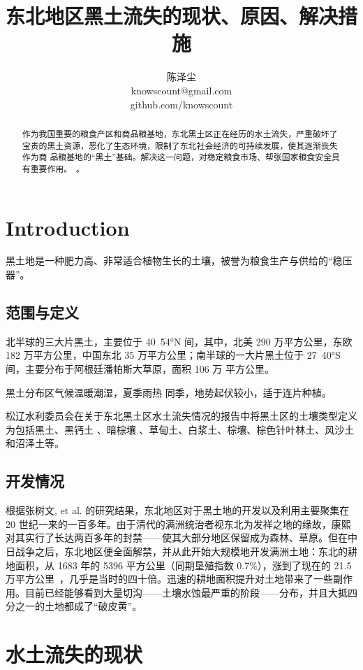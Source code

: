 \documentclass{nle}
\title[东北地区黑土流失的现状、原因、解决措施]
      {东北地区黑土流失的现状、原因、解决措施}
\author[KnowsCount]
      {陈泽尘\\
      knowscount@gmail.com\\
      github.com/knowscount}
\begin{document}
\label{firstpage}
\maketitle

\begin{abstract}
  作为我国重要的粮食产区和商品粮基地，东北黑土区正在经历的水土流失，严重破坏了宝贵的黑土资源，恶化了生态环境，限制了东北社会经济的可持续发展，使其逐渐丧失作为商 品粮基地的“黑土”基础。解决这一问题，对稳定粮食市场、帮张国家粮食安全具有重要作用。~\cite{liubaoyuan:1}。
\end{abstract}

\section{Introduction}

黑土地是一种肥力高、非常适合植物生长的土壤，被誉为粮食生产与供给的“稳压器”。

\subsection{范围与定义}

北半球的三大片黑土，主要位于 40~54°N 间，其中，北美 290 万平方公里，东欧 182 万平方公里，中国东北 35 万平方公里；南半球的一大片黑土位于 27~40°S 间，主要分布于阿根廷潘帕斯大草原，面积 106 万 平方公里。

黑土分布区气候温暖潮湿，夏季雨热 同季，地势起伏较小，适于连片种植。

松辽水利委员会在关于东北黑土区水土流失情况的报告中将黑土区的土壤类型定义为包括黑土、黑钙土 、暗棕壤 、草甸土、白浆土、棕壤、棕色针叶林土、风沙土和沼泽土等。 

\subsection{开发情况}

根据张树文, et al. 的研究结果，东北地区对于黑土地的开发以及利用主要聚集在 20 世纪一来的一百多年。由于清代的满洲统治者视东北为发祥之地的缘故，康熙对其实行了长达两百多年的封禁——使其大部分地区保留成为森林、草原。但在中日战争之后，东北地区便全面解禁，并从此开始大规模地开发满洲土地：东北的耕地面积，从 1683 年的 5396 平方公里（同期垦殖指数 0.7\%），涨到了现在的 21.5 万平方公里~\cite{xinhua:1}，几乎是当时的四十倍。迅速的耕地面积提升对土地带来了一些副作用。目前已经能够看到大量切沟——土壤水蚀最严重的阶段——分布，并且大抵四分之一的土地都成了“破皮黄”。

\section{水土流失的现状}
\end{document}
